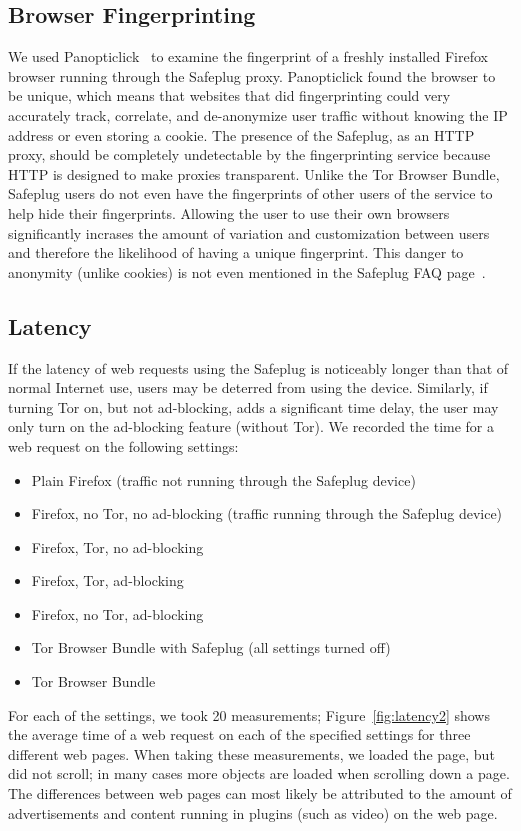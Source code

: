 \documentclass[conference]{IEEEtran}
\begin{document}
\subsection{Browser Fingerprinting}
We used Panopticlick~\cite{panopticlick} to examine the fingerprint of a freshly installed Firefox browser running through the Safeplug proxy.  Panopticlick found the browser to be unique, which means that websites that did fingerprinting could very accurately track, correlate, and de-anonymize user traffic without knowing the IP address or even storing a cookie.  The presence of the Safeplug, as an HTTP proxy, should be completely undetectable by the fingerprinting service because HTTP is designed to make proxies transparent.  Unlike the Tor Browser Bundle, Safeplug users do not even have the fingerprints of other users of the service to help hide their fingerprints.  Allowing the user to use their own browsers significantly incrases the amount of variation and customization between users and therefore the likelihood of having a unique fingerprint.  This danger to anonymity (unlike cookies) is not even mentioned in the Safeplug FAQ page~\cite{safeplug}.

\subsection{Latency}
If the latency of web requests using the Safeplug is noticeably longer than that of normal Internet use, users may be deterred from using the device.  Similarly, if turning Tor on, but not ad-blocking, adds a significant time delay, the user may only turn on the ad-blocking feature (without Tor).  We recorded the time for a web request on the following settings:

\begin{itemize}
\item Plain Firefox (traffic not running through the Safeplug device)
\item Firefox, no Tor, no ad-blocking (traffic running through the Safeplug device)
\item Firefox, Tor, no ad-blocking
\item Firefox, Tor, ad-blocking
\item Firefox, no Tor, ad-blocking
\item Tor Browser Bundle with Safeplug (all settings turned off)
\item Tor Browser Bundle
\end{itemize}

For each of the settings, we took 20 measurements; Figure~\ref{fig:latency2} shows the average time of a web request on each of the specified settings for three different web pages.  When taking these measurements, we loaded the page, but did not scroll; in many cases more objects are loaded when scrolling down a page.  The differences between web pages can most likely be attributed to the amount of advertisements and content running in plugins (such as video) on the web page.  
\end{document}
